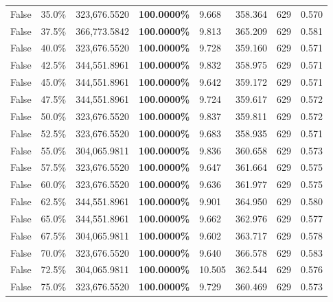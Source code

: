\begin{table}[H]
\begin{tabular}{|m{}| m{}| r | R{0.13\textwidth}| R{0.09\textwidth}| R{0.09\textwidth}| R{0.09\textwidth}| R{0.11\textwidth}|}
False & 35.0\% & 323,676.5520 & \bfseries \color{red} 100.0000\% & 9.668 & 358.364 & 629 & 0.570 \\
False & 37.5\% & 366,773.5842 & \bfseries \color{red} 100.0000\% & 9.813 & 365.209 & 629 & 0.581 \\
False & 40.0\% & 323,676.5520 & \bfseries \color{red} 100.0000\% & 9.728 & 359.160 & 629 & 0.571 \\
False & 42.5\% & 344,551.8961 & \bfseries \color{red} 100.0000\% & 9.832 & 358.975 & 629 & 0.571 \\
False & 45.0\% & 344,551.8961 & \bfseries \color{red} 100.0000\% & 9.642 & 359.172 & 629 & 0.571 \\
False & 47.5\% & 344,551.8961 & \bfseries \color{red} 100.0000\% & 9.724 & 359.617 & 629 & 0.572 \\
False & 50.0\% & 323,676.5520 & \bfseries \color{red} 100.0000\% & 9.837 & 359.811 & 629 & 0.572 \\
False & 52.5\% & 323,676.5520 & \bfseries \color{red} 100.0000\% & 9.683 & 358.935 & 629 & 0.571 \\
False & 55.0\% & \color{red} 304,065.9811 & \bfseries \color{red} 100.0000\% & 9.836 & 360.658 & 629 & 0.573 \\
False & 57.5\% & 323,676.5520 & \bfseries \color{red} 100.0000\% & 9.647 & 361.664 & 629 & 0.575 \\
False & 60.0\% & 323,676.5520 & \bfseries \color{red} 100.0000\% & 9.636 & 361.977 & 629 & 0.575 \\
False & 62.5\% & 344,551.8961 & \bfseries \color{red} 100.0000\% & 9.901 & 364.950 & 629 & 0.580 \\
False & 65.0\% & 344,551.8961 & \bfseries \color{red} 100.0000\% & 9.662 & 362.976 & 629 & 0.577 \\
False & 67.5\% & \color{red} 304,065.9811 & \bfseries \color{red} 100.0000\% & 9.602 & 363.717 & 629 & 0.578 \\
False & 70.0\% & 323,676.5520 & \bfseries \color{red} 100.0000\% & 9.640 & 366.578 & 629 & 0.583 \\
False & 72.5\% & \color{red} 304,065.9811 & \bfseries \color{red} 100.0000\% & 10.505 & 362.544 & 629 & 0.576 \\
False & 75.0\% & 323,676.5520 & \bfseries \color{red} 100.0000\% & 9.729 & 360.469 & 629 & 0.573 \\

\end{tabular}
\end{table}
